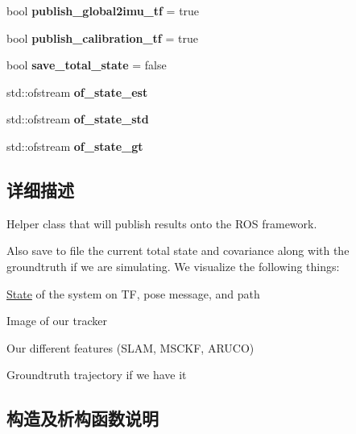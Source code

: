 \begin{DoxyCompactItemize}
bool {\bfseries publish\+\_\+global2imu\+\_\+tf} = true
\item 
\mbox{\label{classov__msckf_1_1ROS1Visualizer_a5e0ae19091760130725778ccf4efba9d}} 
bool {\bfseries publish\+\_\+calibration\+\_\+tf} = true
\item 
\mbox{\label{classov__msckf_1_1ROS1Visualizer_a85f127c8763177c8f99a4989f0fa1057}} 
bool {\bfseries save\+\_\+total\+\_\+state} = false
\item 
\mbox{\label{classov__msckf_1_1ROS1Visualizer_a76dcf1acce0ae297a24f552cb3cc7885}} 
std\+::ofstream {\bfseries of\+\_\+state\+\_\+est}
\item 
\mbox{\label{classov__msckf_1_1ROS1Visualizer_a59895c91ee29491b530a1330cf2e229e}} 
std\+::ofstream {\bfseries of\+\_\+state\+\_\+std}
\item 
\mbox{\label{classov__msckf_1_1ROS1Visualizer_a17caba0b49b67b146003f96163b46cab}} 
std\+::ofstream {\bfseries of\+\_\+state\+\_\+gt}
\end{DoxyCompactItemize}


\subsection{详细描述}
Helper class that will publish results onto the R\+OS framework. 

Also save to file the current total state and covariance along with the groundtruth if we are simulating. We visualize the following things\+:
\begin{DoxyItemize}
\item \hyperlink{classov__msckf_1_1State}{State} of the system on TF, pose message, and path
\item Image of our tracker
\item Our different features (S\+L\+AM, M\+S\+C\+KF, A\+R\+U\+CO)
\item Groundtruth trajectory if we have it 
\end{DoxyItemize}

\subsection{构造及析构函数说明}
\mbox{\label{classov__msckf_1_1ROS1Visualizer_abd76c037fd103010fcdb74d2d9f9e391}} 
